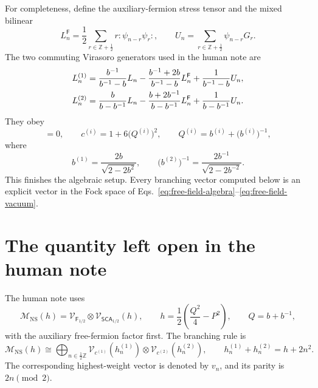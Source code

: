 \documentclass[11pt]{article}
\newcommand{\Ff}{\mathsf F}
\newcommand{\SCA}{\mathsf{SCA}}
\newcommand{\V}{\mathcal V}
\newcommand{\M}{\mathcal M}
\begin{document}
For completeness, define the auxiliary-fermion stress tensor and the mixed
bilinear
\begin{equation}
 L_n^{\Ff}=\frac12\sum_{r\in\mathbb Z+\frac12}
 r:\psi_{n-r}\psi_r:,
 \qquad
 U_n=\sum_{r\in\mathbb Z+\frac12}\psi_{n-r}G_r.
 \label{eq:LF-U}
\end{equation}
The two commuting Virasoro generators used in the human note are
\begin{align}
 L_n^{(1)}
 &=\frac{b^{-1}}{b^{-1}-b}L_n
   -\frac{b^{-1}+2b}{b^{-1}-b}L_n^{\Ff}
   +\frac{1}{b^{-1}-b}U_n,
 \notag\\
 L_n^{(2)}
 &=\frac{b}{b-b^{-1}}L_n
   -\frac{b+2b^{-1}}{b-b^{-1}}L_n^{\Ff}
   +\frac{1}{b-b^{-1}}U_n.
 \label{eq:two-Vir-generators}
\end{align}
They obey
\begin{equation}
 [L_m^{(1)},L_n^{(2)}]=0,
 \qquad
 c^{(i)}=1+6\bigl(Q^{(i)}\bigr)^2,
 \qquad
 Q^{(i)}=b^{(i)}+\bigl(b^{(i)}\bigr)^{-1},
 \label{eq:two-Vir-central-charges}
\end{equation}
where
\begin{equation}
 b^{(1)}=\frac{2b}{\sqrt{2-2b^2}},
 \qquad
 \bigl(b^{(2)}\bigr)^{-1}
 =\frac{2b^{-1}}{\sqrt{2-2b^{-2}}}.
 \label{eq:two-Vir-couplings}
\end{equation}
This finishes the algebraic setup.  Every branching vector computed below is
an explicit vector in the Fock space of
Eqs.~\eqref{eq:free-field-algebra}--\eqref{eq:free-field-vacuum}.

\section{The quantity left open in the human note}

The human note uses
\begin{equation}
 \M_{\mathrm{NS}}(h)
 =\V_{\Ff_{1/2}}\otimes\V_{\SCA_{1/2}}(h),
 \qquad
 h=\frac12\left(\frac{Q^2}{4}-P^2\right),
 \qquad Q=b+b^{-1},
 \label{eq:module}
\end{equation}
with the auxiliary free-fermion factor first.  The branching rule is
\begin{equation}
 \M_{\mathrm{NS}}(h)
 \cong
 \bigoplus_{n\in\frac12\mathbb Z}
 \V_{c^{(1)}}(h_n^{(1)})\otimes
 \V_{c^{(2)}}(h_n^{(2)}),
 \qquad
 h_n^{(1)}+h_n^{(2)}=h+2n^2.
 \label{eq:branching}
\end{equation}
The corresponding highest-weight vector is denoted by \(v_n\), and its
parity is \(2n\pmod2\).
\end{document}
